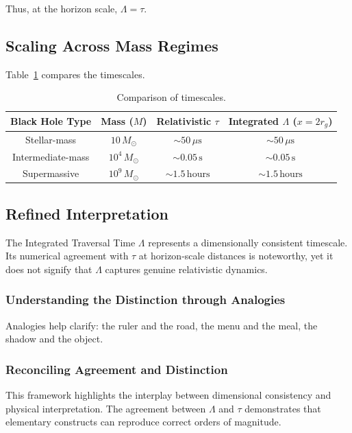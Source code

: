 \documentclass[12pt,a4paper]{article}
\begin{document}
Thus, at the horizon scale, $\Lambda = \tau$.

\subsection{Scaling Across Mass Regimes}

Table~\ref{table:timescales} compares the timescales.

\begin{table}[h!]
\centering
\begin{tabular}{|c|c|c|c|}
\hline
\textbf{Black Hole Type} & \textbf{Mass ($M$)} & \textbf{Relativistic $\tau$} & \textbf{Integrated $\Lambda$ ($x = 2r_g$)} \\
\hline
Stellar-mass & $10\,M_\odot$ & $\sim 50\,\mu\text{s}$ & $\sim 50\,\mu\text{s}$ \\
Intermediate-mass & $10^4\,M_\odot$ & $\sim 0.05\,\text{s}$ & $\sim 0.05\,\text{s}$ \\
Supermassive & $10^9\,M_\odot$ & $\sim 1.5\,\text{hours}$ & $\sim 1.5\,\text{hours}$ \\
\hline
\end{tabular}
\caption{Comparison of timescales.}
\label{table:timescales}
\end{table}

\subsection{Refined Interpretation}

The Integrated Traversal Time $\Lambda$ represents a dimensionally consistent timescale. Its numerical agreement with $\tau$ at horizon-scale distances is noteworthy, yet it does not signify that $\Lambda$ captures genuine relativistic dynamics.

\subsubsection{Understanding the Distinction through Analogies}

Analogies help clarify: the ruler and the road, the menu and the meal, the shadow and the object.

\subsubsection{Reconciling Agreement and Distinction}

This framework highlights the interplay between dimensional consistency and physical interpretation. The agreement between $\Lambda$ and $\tau$ demonstrates that elementary constructs can reproduce correct orders of magnitude.
\end{document}
